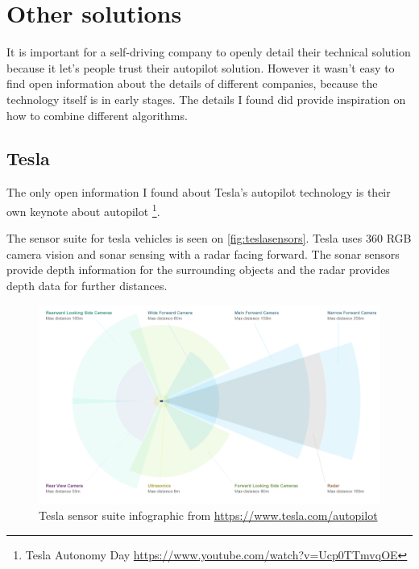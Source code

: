\chapter{Other solutions}
\label{chap:relatedwork}

It is important for a self-driving company to openly detail their technical
solution because it let's people trust their autopilot solution. However it
wasn't easy to find open information about the details of different companies,
because the technology itself is in early stages. The details I found did
provide inspiration on how to combine different algorithms. 

\section{Tesla}
The only open information I found about Tesla's autopilot technology is their
own keynote about autopilot \footnote{Tesla Autonomy Day
\url{https://www.youtube.com/watch?v=Ucp0TTmvqOE}}.


The sensor suite for tesla vehicles is seen on \autoref{fig:teslasensors}. Tesla uses 360\degree
RGB camera vision and sonar sensing with a radar facing forward. The sonar
sensors provide depth information for the surrounding objects and the radar
provides depth data for further distances.  

\begin{figure}[!ht]
  \centering
  \includegraphics[width=150mm, keepaspectratio]{figures/teslasensors.png}
  \caption{Tesla sensor suite infographic from \url{https://www.tesla.com/autopilot}}
  \label{fig:teslasensors}
\end{figure}

